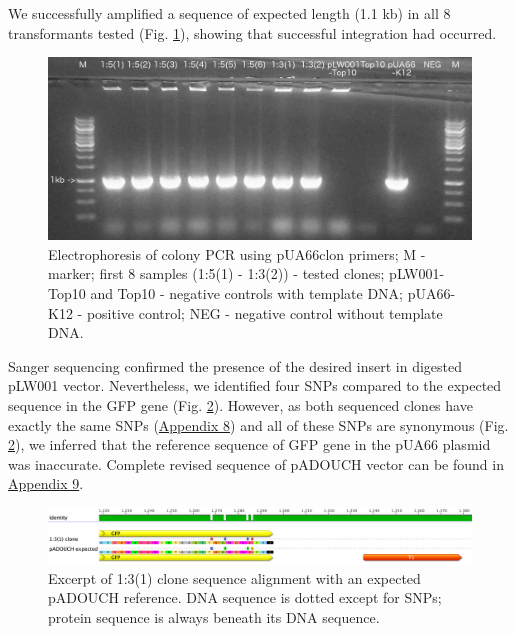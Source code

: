 We successfully amplified a sequence of expected length (1.1 kb) in all 8 transformants tested (Fig. \ref{colonyPCR}), showing that successful integration had occurred.
\begin{figure}[ht!]
  \centering
  \includegraphics[scale=0.16]{text/Pictures/ColonyPCR.jpg}
    \caption{Electrophoresis of colony PCR using pUA66\textunderscore clon primers; M - marker; first 8 samples (1:5(1) - 1:3(2)) - tested clones; pLW001-Top10 and Top10 - negative controls with template DNA; pUA66-K12 - positive control; NEG - negative control without template DNA.}
    \label{colonyPCR}
\end{figure}
Sanger sequencing confirmed the presence of the desired insert in digested pLW001 vector.
Nevertheless, we identified four SNPs compared to the expected sequence in the GFP gene (Fig. \ref{1:3(1)seq}).
However, as both sequenced clones have exactly the same SNPs (\hyperlink{pADOUCHseq}{Appendix 8}) and all of these SNPs are synonymous (Fig. \ref{1:3(1)seq}), we inferred that the reference sequence of GFP gene in the pUA66 plasmid was inaccurate.
Complete revised sequence of pADOUCH vector can be found in \hyperlink{pADOUCHwhole}{Appendix 9}.
\begin{figure}[ht!]
  \centering
  \includegraphics[scale=0.26]{text/Pictures/pADOUCHseq.png}
    \caption{Excerpt of 1:3(1) clone sequence alignment with an expected pADOUCH reference. DNA sequence is dotted except for SNPs; protein sequence is always beneath its DNA sequence.}
    \label{1:3(1)seq}
\end{figure}

\cleardoublepage%

\shorthandon{-} 


